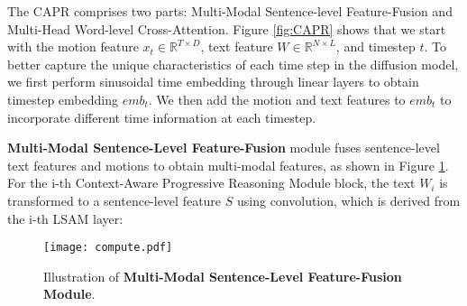 \documentclass[10pt,twocolumn,letterpaper]{article}
\begin{document}
The CAPR comprises two parts: Multi-Modal Sentence-level Feature-Fusion and Multi-Head Word-level Cross-Attention. Figure \ref{fig:CAPR} shows that we start with the motion feature $x_t\in \mathbb{R}^{T \times D}$, text feature $W \in \mathbb{R}^{N \times L}$, and timestep $t$. 
To better capture the unique characteristics of each time step in the diffusion model, we first perform sinusoidal time embedding through linear layers to obtain timestep embedding $emb_t$. We then add the motion and text features to $emb_t$ to incorporate different time information at each timestep.







\textbf{Multi-Modal Sentence-Level Feature-Fusion} module fuses sentence-level text features and motions to obtain multi-modal features, as shown in Figure \ref{fig:compute}. For the i-th Context-Aware Progressive Reasoning Module block, the text $W_i$ is transformed to a sentence-level feature $S$ using convolution, which is derived from the i-th LSAM layer:

  \begin{figure}[h]
  \centering
  \texttt{[image: compute.pdf]}
  \caption{Illustration of \textbf{Multi-Modal Sentence-Level Feature-Fusion Module}.}
  \label{fig:compute}
\end{figure}
\end{document}
